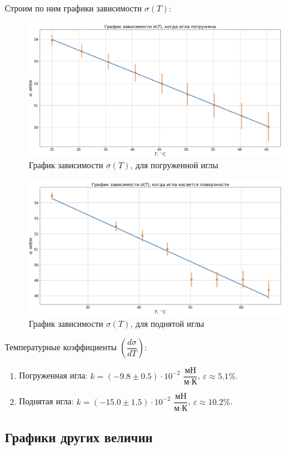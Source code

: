 \documentclass[a4paper,12pt]{article}
\theoremstyle{definition}
\begin{document}
	Строим по ним графики зависимости $\sigma(T)$:
	\begin{figure}[H]
		\centering
		\includegraphics[scale = 0.55]{down}
		\caption{График зависимости $\sigma(T)$, для погруженной иглы}
		\label{graph1}
	\end{figure}
	\begin{figure}[H]
		\centering
		\includegraphics[scale = 0.55]{up}
		\caption{График зависимости $\sigma(T)$, для поднятой иглы}
		\label{graph2}
	\end{figure}
	
	Температурные коэффициенты $\left(\dfrac{d\sigma}{dT}\right)$:
	\begin{enumerate}
		\item Погруженная игла: $k = (-9.8\pm 0.5)\cdot 10^{-2}$ $\dfrac{\text{мН}}{\text{м}\cdot \text{К}}$, $\varepsilon \approx 5.1\%$.
		\item Поднятая игла: $k = (-15.0\pm 1.5)\cdot 10^{-2}$ $\dfrac{\text{мН}}{\text{м}\cdot \text{К}}$, $\varepsilon \approx 10.2\%$.
	\end{enumerate}

	\subsection{Графики других величин}
	
\end{document}
